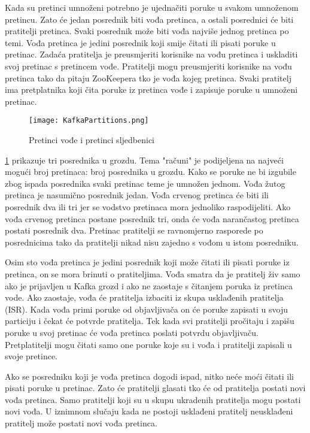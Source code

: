 \documentclass[times, utf8, diplomski, numeric]{fer}
\begin{document}
Kada su pretinci umnoženi potrebno je ujednačiti poruke u svakom umnoženom pretincu. Zato će jedan posrednik biti vođa pretinca, a ostali posrednici će biti pratitelji pretinca. Svaki posrednik može biti vođa najviše jednog pretinca po temi. Vođa pretinca je jedini posrednik koji smije čitati ili pisati poruke u pretinac. Zadaća pratitelja je preusmjeriti korisnike na vođu pretinca i uskladiti svoj pretinac s pretincem vođe. Pratitelji mogu preusmjeriti korisnike na vođu pretinca tako da pitaju ZooKeepera tko je vođa kojeg pretinca. Svaki pratitelj ima pretplatnika koji čita poruke iz pretinca vođe i zapisuje poruke u umnoženi pretinac.

\begin{figure}[H]
    \centering
    \texttt{[image: KafkaPartitions.png]}
    \caption{Pretinci vođe i pretinci sljedbenici}
    \label{fig:kafka-leader-follower}
\end{figure}

\ref{fig:kafka-leader-follower} prikazuje tri posrednika u grozdu. Tema "računi" je podijeljena na najveći mogući broj pretinaca: broj posrednika u grozdu. Kako se poruke ne bi izgubile zbog ispada posrednika svaki pretinac teme je umnožen jednom. Vođa žutog pretinca je nasumično posrednik jedan. Vođa crvenog pretinca će biti ili posrednik dva ili tri jer se vodstvo pretinaca mora jednoliko raspodijeliti. Ako vođa crvenog pretinca postane posrednik tri, onda će vođa narančastog pretinca postati posrednik dva. Pretinac pratitelji se ravnomjerno rasporede po posrednicima tako da pratitelji nikad nisu zajedno s vođom u istom posredniku.

Osim sto vođa pretinca je jedini posrednik koji može čitati ili pisati poruke iz pretinca, on se mora brinuti o pratiteljima. Vođa smatra da je pratitelj živ samo ako je prijavljen u Kafka grozd i ako ne zaostaje s čitanjem poruka iz pretinca vode. Ako zaostaje, vođa će pratitelja izbaciti iz skupa usklađenih pratitelja (ISR). Kada vođa primi poruke od objavljivača on će poruke zapisati u svoju particiju i čekat će potvrde pratitelja. Tek kada svi pratitelji pročitaju i zapišu poruke u svoj pretinac će vođa pretinca poslati potvrdu objavljivaču. Pretplatitelji mogu čitati samo one poruke koje su i vođa i pratitelji zapisali u svoje pretince.

Ako se posredniku koji je vođa pretinca dogodi ispad, nitko neće moći čitati ili pisati poruke u pretinac. Zato će pratitelji glasati tko će od pratitelja postati novi vođa pretinca. Samo pratitelji koji su u skupu ukradenih pratitelja mogu postati novi vođa. U iznimnom slučaju kada ne postoji usklađeni pratitelj neusklađeni pratitelj može postati novi vođa pretinca.
\end{document}
